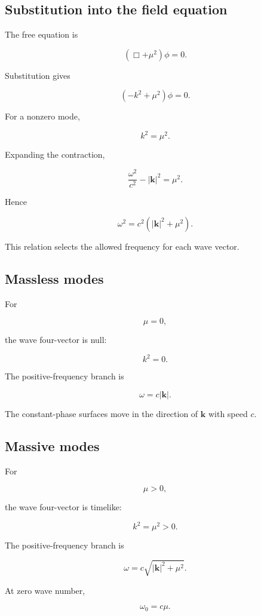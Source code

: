 \subsection{Substitution into the field equation}

The free equation is

\[
(\Box+\mu^{2})\phi=0.
\]

Substitution gives

\[
(-k^{2}+\mu^{2})\phi=0.
\]

For a nonzero mode,

\[
\boxed{
k^{2}=\mu^{2}
}.
\]

Expanding the contraction,

\[
\boxed{
\frac{\omega^{2}}{c^{2}}
-
|\mathbf{k}|^{2}
=
\mu^{2}
}.
\]

Hence

\[
\boxed{
\omega^{2}
=
c^{2}
\left(
|\mathbf{k}|^{2}+\mu^{2}
\right)
}.
\]

This relation selects the allowed frequency for each wave vector.

\subsection{Massless modes}

For

\[
\mu=0,
\]

the wave four-vector is null:

\[
k^{2}=0.
\]

The positive-frequency branch is

\[
\boxed{
\omega=c|\mathbf{k}|
}.
\]

The constant-phase surfaces move in the direction of \(\mathbf{k}\) with speed \(c\).

\subsection{Massive modes}

For

\[
\mu>0,
\]

the wave four-vector is timelike:

\[
k^{2}=\mu^{2}>0.
\]

The positive-frequency branch is

\[
\boxed{
\omega
=
c
\sqrt{|\mathbf{k}|^{2}+\mu^{2}}
}.
\]

At zero wave number,

\[
\boxed{
\omega_{0}=c\mu
}.
\]

